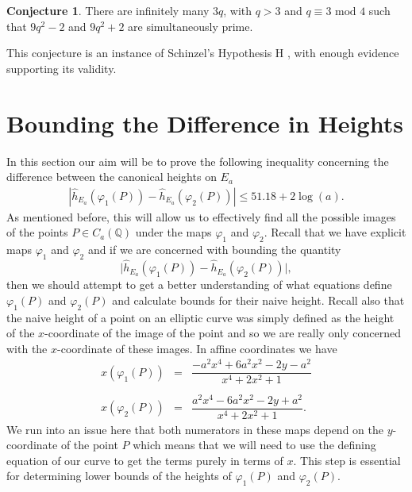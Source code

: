 \documentclass{article}
\newcommand{\Q}{\mathbb{Q}}
\theoremstyle{definition}
\newtheorem{conj}{Conjecture}
\begin{document}
\begin{conj} \label{infinitelymanyprimes}
    There are infinitely many $3q$, with $q > 3$ and $q \equiv 3 \text{ mod } 4$ such that $9q^2 - 2$ and $9q^2 + 2$ are simultaneously prime.
\end{conj}

\noindent This conjecture is an instance of Schinzel's Hypothesis H \cite{schinzel1958certaines}, with enough evidence supporting its validity.


\section{Bounding the Difference in Heights}
In this section our aim will be to prove the following inequality concerning the difference between the canonical heights on $E_a$
\begin{eqnarray*}
    \left| \hat{h}_{E_a}(\varphi_1(P)) - \hat{h}_{E_a}(\varphi_2(P)) \right| \leq 51.18 + 2 \log(a).
\end{eqnarray*}
As mentioned before, this will allow us to effectively find all the possible images of the points $P \in C_a(\Q)$ under the maps $\varphi_1$ and $\varphi_2$. Recall that we have explicit maps $\varphi_1$ and $\varphi_2$ and if we are concerned with bounding the quantity $$\Big|\hat{h}_{E_a}(\varphi_1(P)) - \hat{h}_{E_a}(\varphi_2(P))\Big|,$$
then we should attempt to get a better understanding of what equations define $\varphi_1(P)$ and $\varphi_2(P)$ and calculate bounds for their naive height. Recall also that the naive height of a point on an elliptic curve was simply defined as the height of the $x$-coordinate of the image of the point and so we are really only concerned with the $x$-coordinate of these images. In affine coordinates we have
\begin{eqnarray*}
    x(\varphi_1(P)) &=& \dfrac{-a^2 x^4 + 6a^2 x^2 - 2y - a^2}{x^4 + 2x^2 + 1} \\ \\
    x(\varphi_2(P)) &=& \dfrac{a^2 x^4 - 6a^2 x^2 - 2y + a^2}{x^4 + 2x^2 + 1}.
\end{eqnarray*}
We run into an issue here that both numerators in these maps depend on the $y$-coordinate of the point $P$ which means that we will need to use the defining equation of our curve to get the terms purely in terms of $x$. This step is essential for determining lower bounds of the heights of $\varphi_1(P)$ and $\varphi_2(P)$. \\
\end{document}
